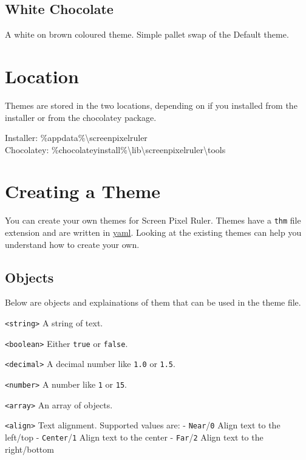 \documentclass[
]{book}
\begin{document}
\subsection{White Chocolate}\label{white-chocolate}

A white on brown coloured theme.
Simple pallet swap of the Default theme.

\section{Location}\label{location-1}

Themes are stored in the two locations, depending on if you installed from the installer or from the chocolatey package.

Installer: \%appdata\%\textbackslash screenpixelruler\\
Chocolatey: \%chocolateyinstall\%\textbackslash lib\textbackslash screenpixelruler\textbackslash tools

\section{Creating a Theme}\label{creating-a-theme}

You can create your own themes for Screen Pixel Ruler.
Themes have a \texttt{thm} file extension and are written in \href{https://yaml.org}{yaml}.
Looking at the existing themes can help you understand how to create your own.

\subsection{Objects}\label{objects}

Below are objects and explainations of them that can be used in the theme file.

\texttt{\textless{}string\textgreater{}} A string of text.

\texttt{\textless{}boolean\textgreater{}} Either \texttt{true} or \texttt{false}.

\texttt{\textless{}decimal\textgreater{}} A decimal number like \texttt{1.0} or \texttt{1.5}.

\texttt{\textless{}number\textgreater{}} A number like \texttt{1} or \texttt{15}.

\texttt{\textless{}array\textgreater{}} An array of objects.

\texttt{\textless{}align\textgreater{}} Text alignment.
Supported values are:
- \texttt{Near}/\texttt{0} Align text to the left/top
- \texttt{Center}/\texttt{1} Align text to the center
- \texttt{Far}/\texttt{2} Align text to the right/bottom
\end{document}
